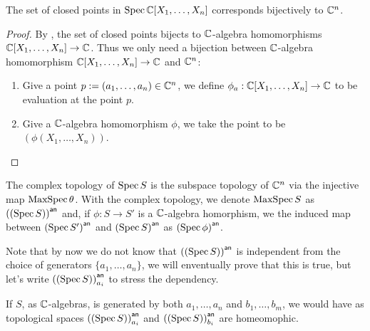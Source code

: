 \begin{theorem}
  The set of closed points in $\operatorname{Spec}{\mathbb{C}[X_{1},\dots, X_{n}]}$ corresponds bijectively to $\mathbb{C}^{n}$.

\end{theorem}
\begin{proof}
  By , the set of closed points
  bijects to $\mathbb{C}$-algebra homomorphisms $\mathbb{C}[X_{1}, \dots, X_{n}] \to \mathbb{C}$. Thus we only need a bijection between $\mathbb{C}$-algebra homomorphism $\mathbb{C}[X_{1}, \dots, X_{n}] \to \mathbb{C}$ and $\mathbb{C}^{n}$:
  \begin{enumerate}
    \item Give a point $p := (a_{1},\dots, a_{n}) \in \mathbb{C}^{n}$, we define $\phi_{a}: \mathbb{C}[X_{1},\dots, X_{n}] \to \mathbb{C}$ to be evaluation at the point $p$.

    \item Give a $\mathbb{C}$-algebra homomorphism $\phi$, we take the point to be $(\phi(X_{1}, \dots, X_{n}))$.
  \end{enumerate}
\end{proof}

\begin{definition}
  The complex topology of $\operatorname{Spec} S$ is the subspace topology of $\mathbb{C}^{n}$ via the injective map $\operatorname{MaxSpec} \theta$. With the complex topology, we denote $\operatorname{MaxSpec} S$ as $\left({\left(\operatorname{Spec} S\right)}\right)^{\mathsf{an}}$ and, if $\phi : S \to S'$ is a $\mathbb{C}$-algebra homorphism, we the induced map between $\left({\operatorname{Spec}{S'}}\right)^{\mathsf{an}}$ and $\left({\operatorname{Spec}{S}}\right)^{\mathsf{an}}$ as $\left({\operatorname{Spec} \phi}\right)^{\mathsf{an}}$.
\end{definition}

Note that by now we do not know that $\left({\left(\operatorname{Spec} S\right)}\right)^{\mathsf{an}}$ is independent from the choice of generators $\{a_{1},\dots, a_{n}\}$, we will enventually prove that this is true, but let's write $\left({\left(\operatorname{Spec} S\right)}\right)^{\mathsf{an}}_{a_{i}}$ to stress the dependency.

\begin{theorem}
If $S$, as $\mathbb{C}$-algebras, is generated by both $a_{1},\dots, a_{n}$ and $b_{1},\dots,b_{m}$, we would have as topological spaces $\left({\left(\operatorname{Spec} S\right)}\right)^{\mathsf{an}}_{a_{i}}$ and $\left({\left(\operatorname{Spec} S\right)}\right)^{\mathsf{an}}_{b_{i}}$ are homeomophic.
\end{theorem}


